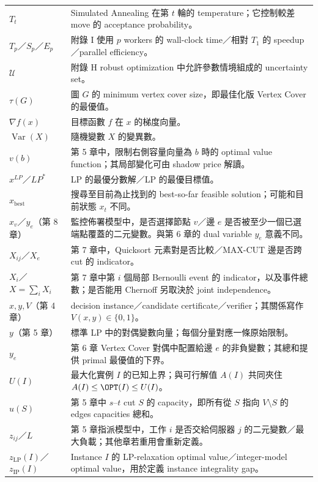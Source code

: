 \documentclass[11pt,a4paper,oneside,openany]{book}
\begin{document}
\begin{longtable}{@{}p{}p{}@{}}
$T_t$ & Simulated Annealing 在第 $t$ 輪的 temperature；它控制較差 move 的 acceptance probability。 \\
$T_p$／$S_p$／$E_p$ & 附錄 I 使用 $p$ workers 的 wall-clock time／相對 $T_1$ 的 speedup／parallel efficiency。 \\
$\mathcal U$ & 附錄 H robust optimization 中允許參數情境組成的 uncertainty set。 \\
$\tau(G)$ & 圖 $G$ 的 minimum vertex cover size，即最佳化版 Vertex Cover 的最優值。 \\
$\nabla f(x)$ & 目標函數 $f$ 在 $x$ 的梯度向量。 \\
$\operatorname{Var}(X)$ & 隨機變數 $X$ 的變異數。 \\
$v(b)$ & 第 5 章中，限制右側容量向量為 $b$ 時的 optimal value function；其局部變化可由 shadow price 解讀。 \\
$x^{LP}$／$LP^*$ & LP 的最優分數解／LP 的最優目標值。 \\
$x_{\mathrm{best}}$ & 搜尋至目前為止找到的 best-so-far feasible solution；可能和目前狀態 $x_t$ 不同。 \\
$x_v$／$y_e$（第 8 章） & 監控佈署模型中，是否選擇節點 $v$／邊 $e$ 是否被至少一個已選端點覆蓋的二元變數。與第 6 章的 dual variable $y_e$ 意義不同。 \\
$X_{ij}$／$X_e$ & 第 7 章中，Quicksort 元素對是否比較／MAX-CUT 邊是否跨 cut 的 indicator。 \\
$X_i$／$X=\sum_iX_i$ & 第 7 章中第 $i$ 個局部 Bernoulli event 的 indicator，以及事件總數；是否能用 Chernoff 另取決於 joint independence。 \\
$x,y,V$（第 4 章） & decision instance／candidate certificate／verifier；其關係寫作 $V(x,y)\in\{0,1\}$。 \\
$y$（第 5 章） & 標準 LP 中的對偶變數向量；每個分量對應一條原始限制。 \\
$y_e$ & 第 6 章 Vertex Cover 對偶中配置給邊 $e$ 的非負變數；其總和提供 primal 最優值的下界。 \\
$U(I)$ & 最大化實例 $I$ 的已知上界；與可行解值 $A(I)$ 共同夾住 $A(I)\le\OPT(I)\le U(I)$。 \\
$u(S)$ & 第 5 章中 $s$--$t$ cut $S$ 的 capacity，即所有從 $S$ 指向 $V\setminus S$ 的 edges capacities 總和。 \\
$z_{ij}$／$L$ & 第 5 章指派模型中，工作 $i$ 是否交給伺服器 $j$ 的二元變數／最大負載；其他章若重用會重新定義。 \\
$z_{\mathrm{LP}}(I)$／$z_{\mathrm{IP}}(I)$ & Instance $I$ 的 LP-relaxation optimal value／integer-model optimal value，用於定義 instance integrality gap。 \\
\bottomrule
\end{longtable}
\normalsize
\end{document}

